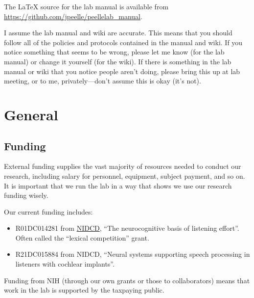 \documentclass[letterpaper,12pt,oneside]{memoir}
\begin{document}
The LaTeX source for the lab manual is available from \url{https://github.com/jpeelle/peellelab_manual}.

 \begin{shaded}
\noindent I assume the lab manual and wiki are accurate. This means that you should follow all of the policies and protocols contained in the manual and wiki. If you notice something that seems to be wrong, please let me know (for the lab manual) or change it yourself (for the wiki). If there is something in the lab manual or wiki that you notice people aren't doing, please bring this up at lab meeting, or to me, privately---don't assume this is okay (it's not).
\end{shaded}


\chapter{General} %

\section{Funding}

External funding supplies the vast majority of resources needed to conduct our research, including salary for personnel, equipment, subject payment, and so on. It is important that we run the lab in a way that shows we use our research funding wisely.

Our current funding includes:

\begin{itemize}
\item R01DC014281 from \href{http://www.nidcd.nih.gov}{NIDCD}, ``The neurocognitive basis of listening effort''. Often called the ``lexical competition'' grant.

\item R21DC015884 from NIDCD, ``Neural systems supporting speech processing in listeners with cochlear implants''.


\end{itemize}

Funding from NIH (through our own grants or those to collaborators) means that work in the lab is supported by the taxpaying public.
\end{document}
